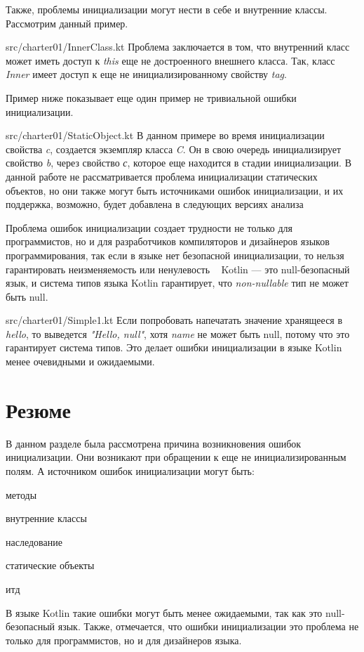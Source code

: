 Также, проблемы инициализации могут нести в себе и внутренние классы.
Рассмотрим данный пример.

{src/charter01/InnerClass.kt}
Проблема заключается в том, что внутренний класс может иметь доступ к \emph{this} еще не достроенного внешнего класса.
Так, класс \emph{Inner} имеет доступ к еще не инициализированному свойству \emph{tag}.

Пример ниже показывает еще один пример не тривиальной ошибки инициализации.

{src/charter01/StaticObject.kt}
В данном примере во время инициализации свойства \emph{c}, создается экземпляр класса \emph{C}.
Он в свою очередь инициализирует свойство \emph{b}, через свойство \emph{с}, которое еще находится в стадии инициализации.
В данной работе не рассматривается проблема инициализации статических объектов,
но они также могут быть источниками ошибок инициализации, и их поддержка, возможно,
будет добавлена в следующих версиях анализа

Проблема ошибок инициализации создает трудности не только для программистов,
но и для разработчиков компиляторов и дизайнеров языков программирования,
так если в языке нет безопасной инициализации, то нельзя гарантировать неизменяемость или ненулевость
~\cite{joe-duffy}
Kotlin --- это null-безопасный язык, и система типов языка Kotlin гарантирует, что \emph{non-nullable} тип не может быть null.

{src/charter01/Simple1.kt}
Если попробовать напечатать значение хранящееся в \emph{hello}, то выведется \emph{"Hello, null"},
хотя \emph{name} не может быть null, потому что это гарантирует система типов.
Это делает ошибки инициализации в языке Kotlin менее очевидными и ожидаемыми.

\section{Резюме}\label{sec:проблема-резюме}

В данном разделе была рассмотрена причина возникновения ошибок инициализации.
Они возникают при обращении к еще не инициализированным полям.
А источником ошибок инициализации могут быть:
\begin{itemize*}
    \item методы
    \item внутренние классы
    \item наследование
    \item статические объекты
    \item итд
\end{itemize*}
В языке Kotlin такие ошибки могут быть менее ожидаемыми, так как это null-безопасный язык.
Также, отмечается, что ошибки инициализации это проблема не только для программистов, но и для дизайнеров языка.